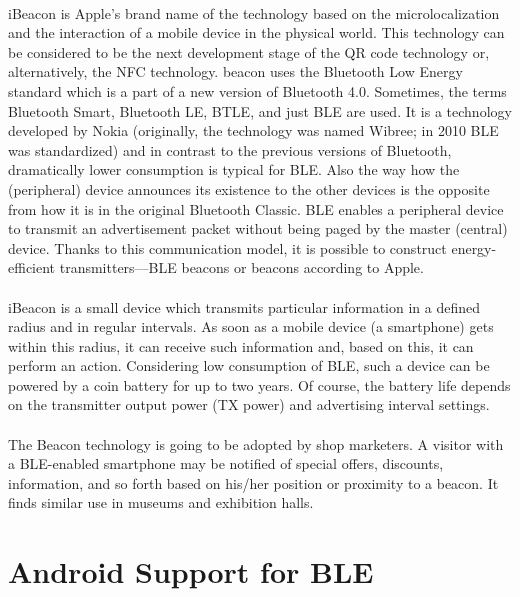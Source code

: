 \documentclass[a4paper,12pt]{report}
\begin{document}
\paragraph{}iBeacon is Apple’s brand name of the technology based on the microlocalization and the interaction of a mobile device in the physical world. This technology can be considered to be the next development stage of the QR code technology or, alternatively, the NFC technology. beacon uses the Bluetooth Low Energy standard which is a part of a new version of Bluetooth 4.0. Sometimes, the terms Bluetooth Smart, Bluetooth LE, BTLE, and just BLE are used. It is a technology developed by Nokia (originally, the technology was named Wibree; in 2010 BLE was standardized) and in contrast to the previous versions of Bluetooth, dramatically lower consumption is typical for BLE. Also the way how the (peripheral) device announces its existence to the other devices is the opposite from how it is in the original Bluetooth Classic. BLE enables a peripheral device to transmit an advertisement packet without being paged by the master (central) device. Thanks to this communication model, it is possible to construct energy-efficient transmitters—BLE beacons or beacons according to Apple.

\paragraph{}iBeacon is a small device which transmits particular information in a defined radius and in regular intervals. As soon as a mobile device (a smartphone) gets within this radius, it can receive such information and, based on this, it can perform an action. Considering low consumption of BLE, such a device can be powered by a coin battery for up to two years. Of course, the battery life depends on the transmitter output power (TX power) and advertising interval settings.

\paragraph{}The Beacon technology is going to be adopted by shop marketers. A visitor with a BLE-enabled smartphone may be notified of special offers, discounts, information, and so forth based on his/her position or proximity to a beacon. It finds similar use in museums and exhibition halls.
\newpage
\section{Android Support for BLE}
\end{document}
